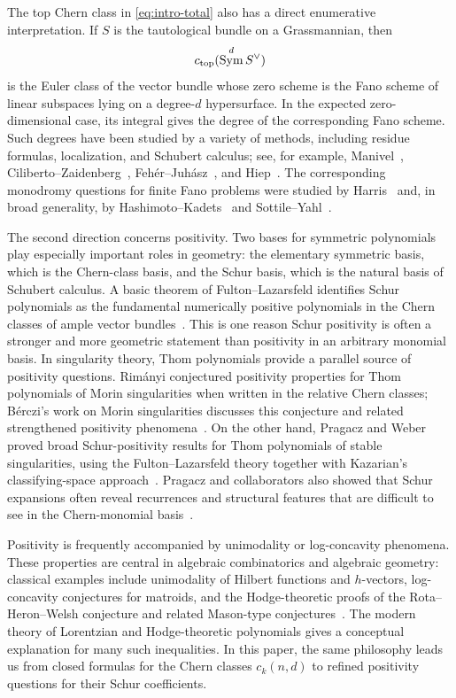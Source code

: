 \documentclass[11pt]{amsart}
\numberwithin{equation}{section}
\theoremstyle{remark}
\DeclareMathOperator{\Sym}{Sym}
\begin{document}
The top Chern class in \eqref{eq:intro-total} also has a direct enumerative interpretation.  If $S$ is the tautological bundle on a Grassmannian, then
\[
  c_{\rm top}(\Sym^dS^\vee)
\]
is the Euler class of the vector bundle whose zero scheme is the Fano scheme of linear subspaces lying on a degree-$d$ hypersurface.  In the expected zero-dimensional case, its integral gives the degree of the corresponding Fano scheme.  Such degrees have been studied by a variety of methods, including residue formulas, localization, and Schubert calculus; see, for example, Manivel~\cite{manivel1999surleshypersurfaces}, Ciliberto--Zaidenberg~\cite{ciliberto_zaidenberg2020onfanoschemes}, Feh\'er--Juh\'asz~\cite{feher2025polynomiality}, and Hiep~\cite{HiepDegree}.  The corresponding monodromy questions for finite Fano problems were studied by Harris~\cite{Harris} and, in broad generality, by Hashimoto--Kadets~\cite{HK} and Sottile--Yahl~\cite{SY}.

The second direction concerns positivity.  Two bases for symmetric polynomials play especially important roles in geometry: the elementary symmetric basis, which is the Chern-class basis, and the Schur basis, which is the natural basis of Schubert calculus.  A basic theorem of Fulton--Lazarsfeld identifies Schur polynomials as the fundamental numerically positive polynomials in the Chern classes of ample vector bundles~\cite{FultonLazarsfeld}.  This is one reason Schur positivity is often a stronger and more geometric statement than positivity in an arbitrary monomial basis.  In singularity theory, Thom polynomials provide a parallel source of positivity questions.  Rim\'anyi \cite{RimanyiThom} conjectured positivity properties for Thom polynomials of Morin singularities when written in the relative Chern classes; B\'erczi's work on Morin singularities discusses this conjecture and related strengthened positivity phenomena~\cite{BercziMorin}.  On the other hand, Pragacz and Weber proved broad Schur-positivity results for Thom polynomials of stable singularities, using the Fulton--Lazarsfeld theory together with Kazarian's classifying-space approach~\cite{PragaczWeber}.  Pragacz and collaborators also showed that Schur expansions often reveal recurrences and structural features that are difficult to see in the Chern-monomial basis~\cite{PragaczThomSchur,LascouxPragaczA3}.

Positivity is frequently accompanied by unimodality or log-concavity phenomena.  These properties are central in algebraic combinatorics and algebraic geometry: classical examples include unimodality of Hilbert functions and $h$-vectors, log-concavity conjectures for matroids, and the Hodge-theoretic proofs of the Rota--Heron--Welsh conjecture and related Mason-type conjectures~\cite{StanleyLogConcavity,Huh,AHK,BrandenHuh}.  The modern theory of Lorentzian and Hodge-theoretic polynomials gives a conceptual explanation for many such inequalities.  In this paper, the same philosophy leads us from closed formulas for the Chern classes $c_k(n,d)$ to refined positivity questions for their Schur coefficients.  
\end{document}

